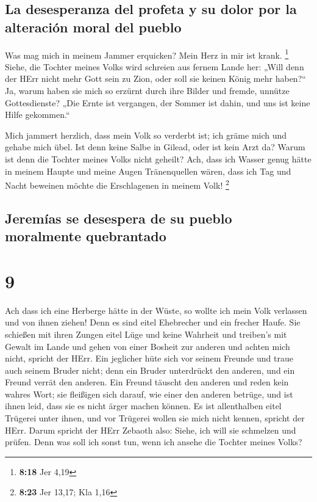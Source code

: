 \hypertarget{la-desesperanza-del-profeta-y-su-dolor-por-la-alteraciuxf3n-moral-del-pueblo}{%
\subsection{La desesperanza del profeta y su dolor por la alteración
moral del
pueblo}\label{la-desesperanza-del-profeta-y-su-dolor-por-la-alteraciuxf3n-moral-del-pueblo}}

 Was mag mich in meinem Jammer erquicken? Mein Herz in
mir ist krank. \footnote{\textbf{8:18} Jer 4,19}  Siehe,
die Tochter meines Volks wird schreien aus fernem Lande her: „Will denn
der HErr nicht mehr Gott sein zu Zion, oder soll sie keinen König mehr
haben?{}`` Ja, warum haben sie mich so erzürnt durch ihre Bilder und
fremde, unnütze Gottesdienste?  „Die Ernte ist vergangen,
der Sommer ist dahin, und uns ist keine Hilfe gekommen.``

 Mich jammert herzlich, dass mein Volk so verderbt ist;
ich gräme mich und gehabe mich übel.  Ist denn keine
Salbe in Gilead, oder ist kein Arzt da? Warum ist denn die Tochter
meines Volks nicht geheilt?  Ach, dass ich Wasser genug
hätte in meinem Haupte und meine Augen Tränenquellen wären, dass ich Tag
und Nacht beweinen möchte die Erschlagenen in meinem Volk! \footnote{\textbf{8:23}
  Jer 13,17; Kla 1,16}

\hypertarget{jeremuxedas-se-desespera-de-su-pueblo-moralmente-quebrantado}{%
\subsection{Jeremías se desespera de su pueblo moralmente
quebrantado}\label{jeremuxedas-se-desespera-de-su-pueblo-moralmente-quebrantado}}

\hypertarget{section-8}{%
\section{9}\label{section-8}}

 Ach dass ich eine Herberge hätte in der Wüste, so wollte
ich mein Volk verlassen und von ihnen ziehen! Denn es sind eitel
Ehebrecher und ein frecher Haufe.  Sie schießen mit ihren
Zungen eitel Lüge und keine Wahrheit und treiben's mit Gewalt im Lande
und gehen von einer Bosheit zur anderen und achten mich nicht, spricht
der HErr.  Ein jeglicher hüte sich vor seinem Freunde und
traue auch seinem Bruder nicht; denn ein Bruder unterdrückt den anderen,
und ein Freund verrät den anderen.  Ein Freund täuscht den
anderen und reden kein wahres Wort; sie fleißigen sich darauf, wie einer
den anderen betrüge, und ist ihnen leid, dass sie es nicht ärger machen
können.  Es ist allenthalben eitel Trügerei unter ihnen,
und vor Trügerei wollen sie mich nicht kennen, spricht der HErr.
 Darum spricht der HErr Zebaoth also: Siehe, ich will sie
schmelzen und prüfen. Denn was soll ich sonst tun, wenn ich ansehe die
Tochter meines Volks?

